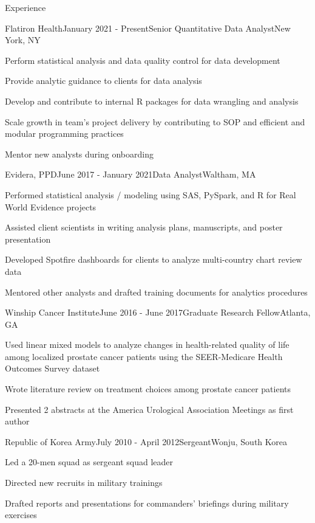 \documentclass{resume}
\begin{document}
  
  \begin{rSection}{Experience}
  
    \begin{rSubsection}{Flatiron Health}{January 2021 - Present}{Senior Quantitative Data Analyst}{New York, NY}
    \item Perform statistical analysis and data quality control for data development
    \item Provide analytic guidance to clients for data analysis 
    \item Develop and contribute to internal R packages for data wrangling and analysis
    \item Scale growth in team's project delivery by contributing to SOP and efficient and modular programming practices
    \item Mentor new analysts during onboarding
    \end{rSubsection}
  
    \begin{rSubsection}{Evidera, PPD}{June 2017 - January 2021}{Data Analyst}{Waltham, MA}
    \item Performed statistical analysis / modeling using SAS, PySpark, and R for Real World Evidence projects
    \item Assisted client scientists in writing analysis plans, manuscripts, and poster presentation
    \item Developed Spotfire dashboards for clients to analyze multi-country chart review data  
    \item Mentored other analysts and drafted training documents for analytics procedures 
    \end{rSubsection}
    
    \begin{rSubsection}{Winship Cancer Institute}{June 2016 - June 2017}{Graduate Research Fellow}{Atlanta, GA}
    \item Used linear mixed models to analyze changes in health-related quality of life among localized prostate cancer patients using the SEER-Medicare Health Outcomes Survey dataset
    \item Wrote literature review on treatment choices among prostate cancer patients
    \item Presented 2 abstracts at the America Urological Association Meetings as first author
    \end{rSubsection}

    \begin{rSubsection}{Republic of Korea Army}{July 2010 - April 2012}{Sergeant}{Wonju, South Korea}
    \item Led a 20-men squad as sergeant squad leader
    \item Directed new recruits in military trainings
    \item Drafted reports and presentations for commanders' briefings during military exercises
    \end{rSubsection}
  \end{rSection}
  
\end{document}
